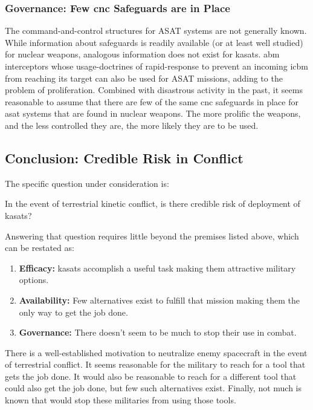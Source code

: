 \subsubsection{Governance: Few \ac{cnc} Safeguards are in Place}
The command-and-control structures for ASAT systems are not generally
known.  While information about safeguards is readily available (or at
least well studied) for nuclear weapons, analogous information does
not exist for \acp{kasat}.  \ac{abm} interceptors whose
usage-doctrines of rapid-response to prevent an incoming \ac{icbm}
from reaching its target can also be used for ASAT missions, adding to
the problem of proliferation.  Combined with disastrous activity in
the past, it seems reasonable to assume that there are few of the same
\ac{cnc} safeguards in place for \ac{asat} systems that are found in
nuclear weapons.  The more prolific the weapons, and the less
controlled they are, the more likely they are to be used.

\subsection{Conclusion: Credible Risk in Conflict}

The specific question under consideration is:

\begin{blockquote}
  In the event of terrestrial kinetic conflict, is there credible risk
  of deployment of \acfp{kasat}?
\end{blockquote}

Answering that question requires little beyond the premises listed
above, which can be restated as:

\begin{enumerate}

\item {\bf Efficacy:} \acfp{kasat} accomplish a useful task making
  them attractive military options.

\item {\bf Availability:} Few alternatives exist to fulfill that
  mission making them the only way to get the job done.

\item {\bf Governance:} There doesn't seem to be much to stop their
  use in combat.

\end{enumerate}

There is a well-established motivation to neutralize enemy spacecraft
in the event of terrestrial conflict.  It seems reasonable for the
military to reach for a tool that gets the job done.  It would also be
reasonable to reach for a different tool that could also get the job
done, but few such alternatives exist.  Finally, not much is known
that would stop these militaries from using those tools.

